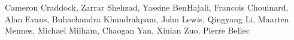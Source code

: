 Cameron Craddock, Zarrar Shehzad, Yassine BenHajali, Francois Chouinard, Alan Evans, Buhachandra Khundrakpam, John Lewis, Qingyang Li, Maarten Mennes, Michael Milham, Chaogan Yan, Xinian Zuo, Pierre Bellec